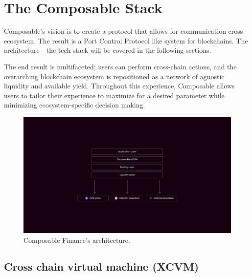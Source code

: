 \section{The Composable Stack}

Composable's vision is to create a protocol that allows for communication cross-ecosystem. The result is a Port Control Protocol like system for blockchains.
%
The architecture - the tech stack will be covered in the following sections.

The end result is multifaceted; users can perform cross-chain actions, and the overarching blockchain ecosystem is repositioned as a network of agnostic liquidity and available yield. Throughout this experience, Composable allows users to tailor their experience to maximize for a desired parameter while minimizing ecosystem-specific decision making.

%
\begin{figure}
    \centering
    \includegraphics[width=15cm]{images/stack.jpg}
    \caption{Composable Finance's architecture.}
    \label{fig:stack}
\end{figure}
%

\subsection{Cross chain virtual machine (XCVM)}

